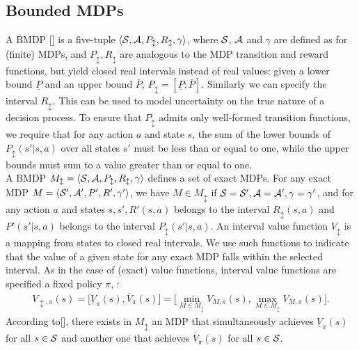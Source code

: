 \subsection{Bounded \ac{MDPs}}
A \acf{BMDP} [\cite{givan2000bounded}] is a five-tuple $\langle \mathcal{S}, \mathcal{A}, P_{\updownarrow}, R_{\updownarrow}, \gamma \rangle$, where $\mathcal{S}$, $\mathcal{A}$ and $\gamma$ are defined as for (finite) MDPs, and $P_{\updownarrow}, R_{\updownarrow}$ are analogous to the MDP transition and reward functions, but yield closed real intervals instead of real values: given a lower bound $\underline{P}$ and an upper bound $\overline{P}$, $P_{\updownarrow} = [\underline{P}; \overline{P}]$. Similarly we can specify the interval $R_{\updownarrow}$. This can be used to model uncertainty on the true nature of a decision process. To ensure that $P_{\updownarrow}$ admits only well-formed transition functions, we require that for any action $a$ and state $s$, the sum of the lower bounds of $P_{\updownarrow}(s'|s,a)$ over all states $s'$ must be less than or equal to one, while the upper bounds must sum to a value greater than or equal to one.\\
\newline
A BMDP $M_{\updownarrow} = \langle \mathcal{S}, \mathcal{A}, P_{\updownarrow}, R_{\updownarrow}, \gamma \rangle$ defines a set of exact MDPs. For any exact MDP $M = \langle \mathcal{S}', \mathcal{A}', P', R', \gamma' \rangle$, we have $M \in M_{\updownarrow}$ if $\mathcal{S} = \mathcal{S}', \mathcal{A} = \mathcal{A}', \gamma = \gamma'$, and for any action $a$ and states $s, s', R'(s,a)$ belongs to the interval $R_{\updownarrow}(s,a)$ and $P'(s'|s,a)$ belongs to the interval $P_{\updownarrow}(s'|s,a)$. An interval value function $V_{\updownarrow}$ is a mapping from states to closed real intervals. We use such functions to indicate that the value of a given state for any exact MDP falls within the selected interval. As in the case of (exact) value functions, interval value functions are specified \wrt a fixed policy $\pi$, \ie:
\begin{align} V_{\updownarrow, \pi}(s) = \Big[ \underline{V}_{\pi}(s), \overline{V}_{\pi}(s)\Big] = \Big[ \min_{M \in M_{\updownarrow}} V_{M,\pi}(s), \max_{M \in M_{\updownarrow}} V_{M,\pi}(s)\Big]. \end{align}
According to[\cite{givan2000bounded}], there exists in $M_{\updownarrow}$ an \ac{MDP} that simultaneously achieves $\underline{V}_{\pi}(s)$ for all $s \in \mathcal{S}$ and another one that achieves $\overline{V}_{\pi}(s)$ for all $s \in \mathcal{S}$.\\
